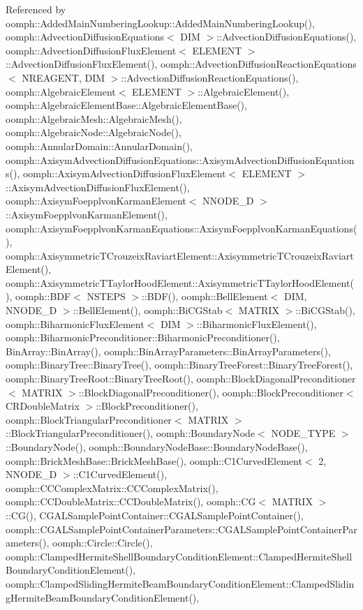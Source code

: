 Referenced by oomph\+::\+Added\+Main\+Numbering\+Lookup\+::\+Added\+Main\+Numbering\+Lookup(), oomph\+::\+Advection\+Diffusion\+Equations$<$ D\+I\+M $>$\+::\+Advection\+Diffusion\+Equations(), oomph\+::\+Advection\+Diffusion\+Flux\+Element$<$ E\+L\+E\+M\+E\+N\+T $>$\+::\+Advection\+Diffusion\+Flux\+Element(), oomph\+::\+Advection\+Diffusion\+Reaction\+Equations$<$ N\+R\+E\+A\+G\+E\+N\+T, D\+I\+M $>$\+::\+Advection\+Diffusion\+Reaction\+Equations(), oomph\+::\+Algebraic\+Element$<$ E\+L\+E\+M\+E\+N\+T $>$\+::\+Algebraic\+Element(), oomph\+::\+Algebraic\+Element\+Base\+::\+Algebraic\+Element\+Base(), oomph\+::\+Algebraic\+Mesh\+::\+Algebraic\+Mesh(), oomph\+::\+Algebraic\+Node\+::\+Algebraic\+Node(), oomph\+::\+Annular\+Domain\+::\+Annular\+Domain(), oomph\+::\+Axisym\+Advection\+Diffusion\+Equations\+::\+Axisym\+Advection\+Diffusion\+Equations(), oomph\+::\+Axisym\+Advection\+Diffusion\+Flux\+Element$<$ E\+L\+E\+M\+E\+N\+T $>$\+::\+Axisym\+Advection\+Diffusion\+Flux\+Element(), oomph\+::\+Axisym\+Foepplvon\+Karman\+Element$<$ N\+N\+O\+D\+E\+\_\+D $>$\+::\+Axisym\+Foepplvon\+Karman\+Element(), oomph\+::\+Axisym\+Foepplvon\+Karman\+Equations\+::\+Axisym\+Foepplvon\+Karman\+Equations(), oomph\+::\+Axisymmetric\+T\+Crouzeix\+Raviart\+Element\+::\+Axisymmetric\+T\+Crouzeix\+Raviart\+Element(), oomph\+::\+Axisymmetric\+T\+Taylor\+Hood\+Element\+::\+Axisymmetric\+T\+Taylor\+Hood\+Element(), oomph\+::\+B\+D\+F$<$ N\+S\+T\+E\+P\+S $>$\+::\+B\+D\+F(), oomph\+::\+Bell\+Element$<$ D\+I\+M, N\+N\+O\+D\+E\+\_\+D $>$\+::\+Bell\+Element(), oomph\+::\+Bi\+C\+G\+Stab$<$ M\+A\+T\+R\+I\+X $>$\+::\+Bi\+C\+G\+Stab(), oomph\+::\+Biharmonic\+Flux\+Element$<$ D\+I\+M $>$\+::\+Biharmonic\+Flux\+Element(), oomph\+::\+Biharmonic\+Preconditioner\+::\+Biharmonic\+Preconditioner(), Bin\+Array\+::\+Bin\+Array(), oomph\+::\+Bin\+Array\+Parameters\+::\+Bin\+Array\+Parameters(), oomph\+::\+Binary\+Tree\+::\+Binary\+Tree(), oomph\+::\+Binary\+Tree\+Forest\+::\+Binary\+Tree\+Forest(), oomph\+::\+Binary\+Tree\+Root\+::\+Binary\+Tree\+Root(), oomph\+::\+Block\+Diagonal\+Preconditioner$<$ M\+A\+T\+R\+I\+X $>$\+::\+Block\+Diagonal\+Preconditioner(), oomph\+::\+Block\+Preconditioner$<$ C\+R\+Double\+Matrix $>$\+::\+Block\+Preconditioner(), oomph\+::\+Block\+Triangular\+Preconditioner$<$ M\+A\+T\+R\+I\+X $>$\+::\+Block\+Triangular\+Preconditioner(), oomph\+::\+Boundary\+Node$<$ N\+O\+D\+E\+\_\+\+T\+Y\+P\+E $>$\+::\+Boundary\+Node(), oomph\+::\+Boundary\+Node\+Base\+::\+Boundary\+Node\+Base(), oomph\+::\+Brick\+Mesh\+Base\+::\+Brick\+Mesh\+Base(), oomph\+::\+C1\+Curved\+Element$<$ 2, N\+N\+O\+D\+E\+\_\+D $>$\+::\+C1\+Curved\+Element(), oomph\+::\+C\+C\+Complex\+Matrix\+::\+C\+C\+Complex\+Matrix(), oomph\+::\+C\+C\+Double\+Matrix\+::\+C\+C\+Double\+Matrix(), oomph\+::\+C\+G$<$ M\+A\+T\+R\+I\+X $>$\+::\+C\+G(), C\+G\+A\+L\+Sample\+Point\+Container\+::\+C\+G\+A\+L\+Sample\+Point\+Container(), oomph\+::\+C\+G\+A\+L\+Sample\+Point\+Container\+Parameters\+::\+C\+G\+A\+L\+Sample\+Point\+Container\+Parameters(), oomph\+::\+Circle\+::\+Circle(), oomph\+::\+Clamped\+Hermite\+Shell\+Boundary\+Condition\+Element\+::\+Clamped\+Hermite\+Shell\+Boundary\+Condition\+Element(), oomph\+::\+Clamped\+Sliding\+Hermite\+Beam\+Boundary\+Condition\+Element\+::\+Clamped\+Sliding\+Hermite\+Beam\+Boundary\+Condition\+Element(), 